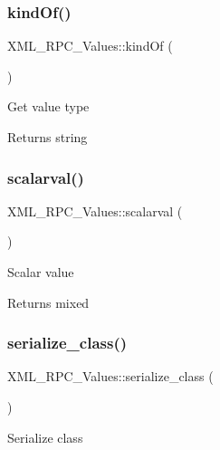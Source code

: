 \subsubsection{\texorpdfstring{kind\+Of()}{kindOf()}}
{\footnotesize\ttfamily X\+M\+L\+\_\+\+R\+P\+C\+\_\+\+Values\+::kind\+Of (\begin{DoxyParamCaption}{ }\end{DoxyParamCaption})}

Get value type

\begin{DoxyReturn}{Returns}
string 
\end{DoxyReturn}
\mbox{\label{class_x_m_l___r_p_c___values_a44612d1c7abce23c41652478de1001ac}} 
\subsubsection{\texorpdfstring{scalarval()}{scalarval()}}
{\footnotesize\ttfamily X\+M\+L\+\_\+\+R\+P\+C\+\_\+\+Values\+::scalarval (\begin{DoxyParamCaption}{ }\end{DoxyParamCaption})}

Scalar value

\begin{DoxyReturn}{Returns}
mixed 
\end{DoxyReturn}
\mbox{\label{class_x_m_l___r_p_c___values_a23f9f904e58930e3f3ea0f25d0d50d8f}} 
\subsubsection{\texorpdfstring{serialize\+\_\+class()}{serialize\_class()}}
{\footnotesize\ttfamily X\+M\+L\+\_\+\+R\+P\+C\+\_\+\+Values\+::serialize\+\_\+class (\begin{DoxyParamCaption}{ }\end{DoxyParamCaption})}

Serialize class

